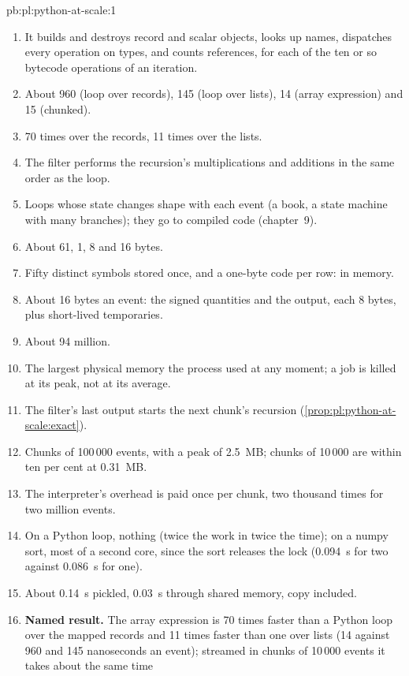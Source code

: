 \begin{solution}{pb:pl:python-at-scale:1}
\begin{enumerate}
\item It builds and destroys record and scalar objects, looks up names, dispatches every operation on types, and counts references,
for each of the ten or so bytecode operations of an iteration.
\item About 960 (loop over records), 145 (loop over lists), 14 (array expression) and 15 (chunked).
\item 70 times over the records, 11 times over the lists.
\item The filter performs the recursion's multiplications and additions in the same order as the loop.
\item Loops whose state changes shape with each event (a book, a state machine with many branches); they go to compiled code
(chapter~9).
\item About 61, 1, 8 and 16 bytes.
\item Fifty distinct symbols stored once, and a one-byte code per row:  in memory.
\item About 16 bytes an event: the signed quantities and the output, each 8 bytes, plus short-lived temporaries.
\item About 94 million.
\item The largest physical memory the process used at any moment; a job is killed at its peak, not at its average.
\item The filter's last output starts the next chunk's recursion (\cref{prop:pl:python-at-scale:exact}).
\item Chunks of 100\,000 events, with a peak of 2.5~MB; chunks of 10\,000 are within ten per cent at 0.31~MB.
\item The interpreter's overhead is paid once per chunk, two thousand times for two million events.
\item On a Python loop, nothing (twice the work in twice the time); on a numpy sort, most of a second core, since the sort releases the
lock (0.094~s for two against 0.086~s for one).
\item About 0.14~s pickled, 0.03~s through shared memory, copy included.
\item \textbf{Named result.} The array expression is 70 times faster than a Python loop over the mapped records and 11 times faster
than one over lists (14 against 960 and 145 nanoseconds an event); streamed in chunks of 10\,000 events it takes about the same time

\end{enumerate}
\end{solution}
